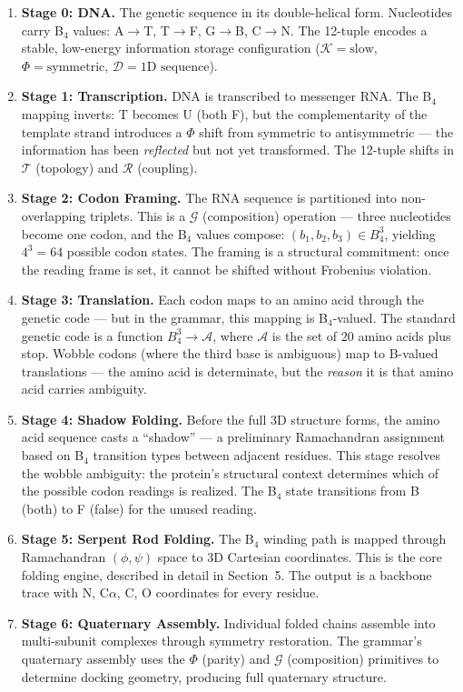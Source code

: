 \documentclass[11pt,a4paper,twocolumn]{article}
\begin{document}
\begin{enumerate}
\item \textbf{Stage 0: DNA.} The genetic sequence in its double-helical form. Nucleotides carry B$_4$ values: A$\to$T, T$\to$F, G$\to$B, C$\to$N. The 12-tuple encodes a stable, low-energy information storage configuration ($\mathcal{K} = \text{slow}$, $\Phi = \text{symmetric}$, $\mathcal{D} = \text{1D sequence}$).

\item \textbf{Stage 1: Transcription.} DNA is transcribed to messenger RNA. The B$_4$ mapping inverts: T becomes U (both F), but the complementarity of the template strand introduces a $\Phi$ shift from symmetric to antisymmetric — the information has been \emph{reflected} but not yet transformed. The 12-tuple shifts in $\mathcal{T}$ (topology) and $\mathcal{R}$ (coupling).

\item \textbf{Stage 2: Codon Framing.} The RNA sequence is partitioned into non-overlapping triplets. This is a $\mathcal{G}$ (composition) operation — three nucleotides become one codon, and the B$_4$ values compose: $(b_1, b_2, b_3) \in B_4^3$, yielding $4^3 = 64$ possible codon states. The framing is a structural commitment: once the reading frame is set, it cannot be shifted without Frobenius violation.

\item \textbf{Stage 3: Translation.} Each codon maps to an amino acid through the genetic code — but in the grammar, this mapping is B$_4$-valued. The standard genetic code is a function $B_4^3 \to \mathcal{A}$, where $\mathcal{A}$ is the set of 20 amino acids plus stop. Wobble codons (where the third base is ambiguous) map to B-valued translations — the amino acid is determinate, but the \emph{reason} it is that amino acid carries ambiguity.

\item \textbf{Stage 4: Shadow Folding.} Before the full 3D structure forms, the amino acid sequence casts a ``shadow'' — a preliminary Ramachandran assignment based on B$_4$ transition types between adjacent residues. This stage resolves the wobble ambiguity: the protein's structural context determines which of the possible codon readings is realized. The B$_4$ state transitions from B (both) to F (false) for the unused reading.

\item \textbf{Stage 5: Serpent Rod Folding.} The B$_4$ winding path is mapped through Ramachandran $(\phi,\psi)$ space to 3D Cartesian coordinates. This is the core folding engine, described in detail in Section~5. The output is a backbone trace with N, C$\alpha$, C, O coordinates for every residue.

\item \textbf{Stage 6: Quaternary Assembly.} Individual folded chains assemble into multi-subunit complexes through symmetry restoration. The grammar's quaternary assembly uses the $\Phi$ (parity) and $\mathcal{G}$ (composition) primitives to determine docking geometry, producing full quaternary structure.
\end{enumerate}
\end{document}
